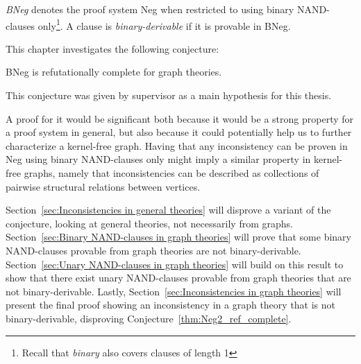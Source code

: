 

\begin{definition}
  \textit{BNeg} denotes the proof system Neg when restricted to using binary NAND-clauses only\footnote{Recall that \textit{binary} also covers clauses of length 1}.
  A clause is \textit{binary-derivable} if it is provable in BNeg.
\end{definition}
This chapter investigates the following conjecture:
\begin{conjecture}
  BNeg is refutationally complete for graph theories.
  \label{thm:Neg2_ref_complete}
\end{conjecture}
This conjecture was given by supervisor as a main hypothesis for this thesis.

A proof for it would be significant both because it would be a strong property for a proof system in general, but also because it could potentially help us to further characterize a kernel-free graph.
Having that any inconsistency can be proven in Neg using binary NAND-clauses only might imply a similar property in kernel-free graphs, namely that inconsistencies can be described as collections of pairwise structural relations between vertices.

Section~\ref{sec:Inconsistencies in general theories} will disprove a variant of the conjecture, looking at general theories, not necessarily from graphs.
Section~\ref{sec:Binary NAND-clauses in graph theories} will prove that some binary NAND-clauses provable from graph theories are not binary-derivable.
Section~\ref{sec:Unary NAND-clauses in graph theories} will build on this result to show that there exist unary NAND-clauses provable from graph theories that are not binary-derivable.
Lastly, Section~\ref{sec:Inconsistencies in graph theories} will present the final proof showing an inconsistency in a graph theory that is not binary-derivable, disproving Conjecture~\ref{thm:Neg2_ref_complete}.
